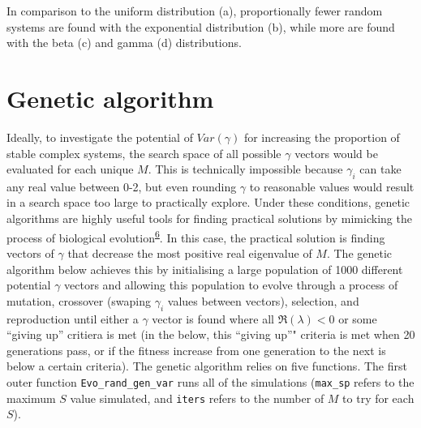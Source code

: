\documentclass[]{article}
\begin{document}
In comparison to the uniform distribution (a), proportionally fewer
random systems are found with the exponential distribution (b), while
more are found with the beta (c) and gamma (d) distributions.

\hypertarget{ga}{\section{Genetic algorithm}\label{ga}}

Ideally, to investigate the potential of \(Var(\gamma)\) for increasing
the proportion of stable complex systems, the search space of all
possible \(\gamma\) vectors would be evaluated for each unique \(M\).
This is technically impossible because \(\gamma_{i}\) can take any real
value between 0-2, but even rounding \(\gamma\) to reasonable values
would result in a search space too large to practically explore. Under
these conditions, genetic algorithms are highly useful tools for finding
practical solutions by mimicking the process of biological
evolution\textsuperscript{\protect\hyperlink{ref-Hamblin2013}{6}}. In
this case, the practical solution is finding vectors of \(\gamma\) that
decrease the most positive real eigenvalue of \(M\). The genetic
algorithm below achieves this by initialising a large population of 1000
different potential \(\gamma\) vectors and allowing this population to
evolve through a process of mutation, crossover (swaping \(\gamma_{i}\)
values between vectors), selection, and reproduction until either a
\(\gamma\) vector is found where all \(\Re(\lambda) < 0\) or some
``giving up'' critiera is met (in the below, this ``giving up''"
criteria is met when 20 generations pass, or if the fitness increase
from one generation to the next is below a certain criteria). The
genetic algorithm relies on five functions. The first outer function
\texttt{Evo\_rand\_gen\_var} runs all of the simulations
(\texttt{max\_sp} refers to the maximum \(S\) value simulated, and
\texttt{iters} refers to the number of \(M\) to try for each \(S\)).
\end{document}
